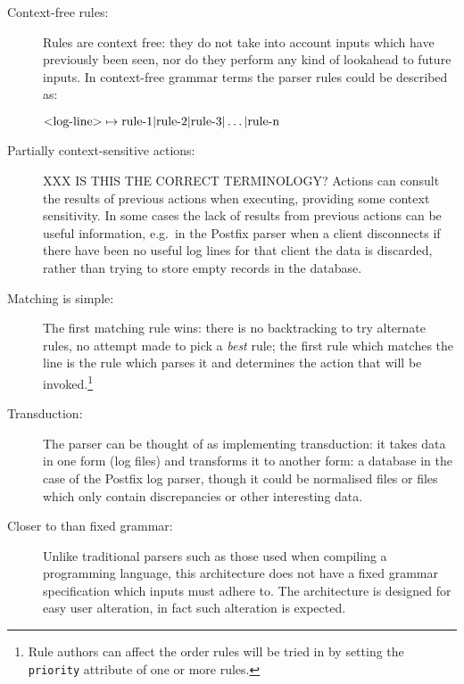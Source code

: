 \documentclass[draft]{svmult}
\begin{document}
\begin{description}

    \item [Context-free rules:]  Rules are context free: they do not take
        into account inputs which have previously been seen, nor do they
        perform any kind of lookahead to future inputs.  In context-free
        grammar terms the parser rules could be described as:

        $\text{\textless{}log-line\textgreater{}} \mapsto \text{rule-1} |
        \text{rule-2} | \text{rule-3} | \dots | \text{rule-n}$

    \item [Partially context-sensitive actions:]  XXX IS THIS THE CORRECT
        TERMINOLOGY\@?  Actions can consult the results of previous actions
        when executing, providing some context sensitivity.  In some cases
        the lack of results from previous actions can be useful
        information, e.g.\ in the Postfix parser when a client disconnects
        if there have been no useful log lines for that client the data is
        discarded, rather than trying to store empty records in the
        database.

    \item [Matching is simple:]  The first matching rule wins: there is no
        backtracking to try alternate rules, no attempt made to pick a
        \textit{best\/} rule; the first rule which matches the line is the
        rule which parses it and determines the action that will be
        invoked.\footnote{Rule authors can affect the order rules will be
        tried in by setting the \texttt{priority} attribute of one or more
        rules.}

    \item [Transduction:]  The parser can be thought of as implementing
        transduction: it takes data in one form (log files) and transforms
        it to another form: a database in the case of the Postfix log
        parser, though it could be normalised files or files which only
        contain discrepancies or other interesting data.

    \item [Closer to \NLP{} than fixed grammar:]  Unlike traditional
        parsers such as those used when compiling a programming language,
        this architecture does not have a fixed grammar specification which
        inputs must adhere to.  The architecture is designed for easy user
        alteration, in fact such alteration is expected.


\end{description}
\end{document}
